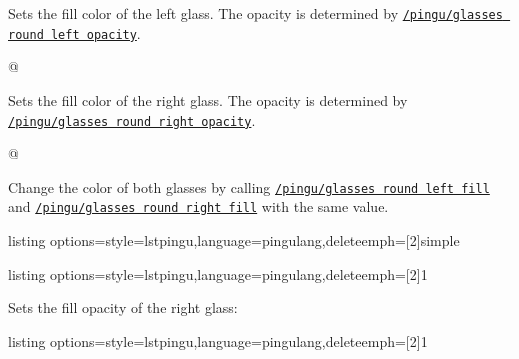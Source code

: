 \documentclass[parskip=half,english,numbers=noenddot,footnotes=nomultiple,oneside,fontsize=10pt,DIV=15,headinclude]{scrartcl}
\makeatletter
\def\pingu@listing@text{}
\def\lpingu#1{\begingroup\def\pingu@listing@text{#1}\lstinline[style=lstpingu,breakatwhitespace]'#1'\endgroup}
\newcommand*\keyref[2][/pingu/]{\hyperref[pk:#1#2]{\lpingu{#1#2}}}
\makeatother
\begin{document}
{{
	Sets the fill color of the left glass. The opacity is determined by \keyref{glasses round left opacity}.
\begin{tcblisting}{@}
\begin{tikzpicture}
	\pingu[glasses round,
	       glasses round left fill=green]
\end{tikzpicture}
\end{tcblisting}
\endsubkeyexplain

	Sets the fill color of the right glass. The opacity is determined by \keyref{glasses round right opacity}.
\begin{tcblisting}{@}
\begin{tikzpicture}
	\pingu[glasses round,
		  glasses round right fill=green]
\end{tikzpicture}
\end{tcblisting}
\endsubkeyexplain

	Change the color of both glasses by calling \keyref{glasses round left fill} and \keyref{glasses round right fill} with the same value.
\begin{tcblisting}{listing options={style=lstpingu,language=pingulang,deleteemph={[2]{simple}}}}
\begin{tikzpicture}
	\pingu[glasses round, glasses round fill=green]
\end{tikzpicture}
\end{tcblisting}
\endsubkeyexplain

\begin{tcblisting}{listing options={style=lstpingu,language=pingulang,deleteemph={[2]{1}}}}
\begin{tikzpicture}
	\pingu[glasses round,
			 glasses round left fill=green,
			 glasses round left opacity=1]
\end{tikzpicture}
\end{tcblisting}
\endsubkeyexplain

	Sets the fill opacity of the right glass:
\begin{tcblisting}{listing options={style=lstpingu,language=pingulang,deleteemph={[2]{1}}}}
\begin{tikzpicture}
	\pingu[glasses round,
			 glasses round right fill=green,
			 glasses round right opacity=1]
\end{tikzpicture}
\end{tcblisting}
\endsubkeyexplain

}}
\end{document}
